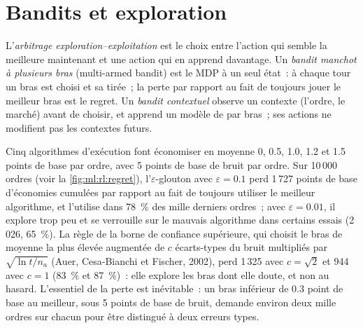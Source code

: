 \section{Bandits et exploration}

\begin{definition}\label{def:ml:reinforcement-learning-foundations:bandit}
L'\emph{arbitrage exploration--exploitation} est le choix entre l'action qui
semble la meilleure maintenant et une action qui en apprend davantage. Un \emph{bandit manchot à plusieurs bras} (multi-armed bandit) est le MDP à un
seul état~: à chaque tour un bras est choisi et sa  tirée~; la perte par rapport au fait de toujours jouer le meilleur bras est le regret. Un
\emph{bandit contextuel} observe un contexte (l'ordre, le marché) avant de choisir, et apprend un
modèle de  par bras~; ses actions ne modifient pas les contextes futurs.
\end{definition}

Cinq algorithmes d'exécution font économiser en moyenne 0, 0.5, 1.0, 1.2 et 1.5 points de base par ordre, avec 5 points de base de bruit par
ordre. Sur 10\,000 ordres (voir la \cref{fig:ml:rl:regret}), l'$\varepsilon$-glouton avec $\varepsilon = 0.1$ perd 1\,727 points de base
d'économies cumulées par rapport au fait de toujours utiliser le meilleur algorithme, et l'utilise dans 78~\% des mille derniers ordres~; avec
$\varepsilon = 0.01$, il explore trop peu et se verrouille sur le mauvais algorithme dans certains essais (2\,026, 65~\%). La règle de la
borne de confiance supérieure, qui choisit le bras de moyenne la plus élevée augmentée de $c$ écarts-types du bruit multipliés par $\sqrt{\ln t/n_a}$
(Auer, Cesa-Bianchi et Fischer, 2002), perd 1\,325 avec $c = \sqrt2$ et 944 avec $c = 1$ (83~\% et 87~\%)~: elle explore les
bras dont elle doute, et non au hasard. L'essentiel de la perte est inévitable~: un bras inférieur de 0.3 point de base au meilleur, sous
5 points de base de bruit, demande environ deux mille ordres sur chacun pour être distingué à deux erreurs types.

